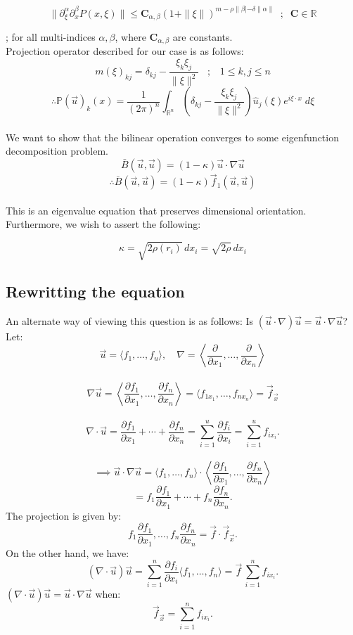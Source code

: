 \documentclass[12pt]{article}
\begin{document}
\[\|\partial_{\xi}^{\alpha} \partial_{x}^{\beta} P(x,\xi)\| \le \mathbf{C}_{\alpha,\beta} (1+\|\xi\|)^{m-\rho \|\beta| - \delta\|\alpha\|} \;\;;\;\; \mathbf{C}\in\mathbb{R}\] 

; for all multi-indices $\alpha, \beta$, where $\textbf{C}_{\alpha, \beta}$ are constants. \\ 

Projection operator described for our case is as follows: 
\[m(\xi)_{kj} = \delta_{kj} - \frac{\xi_{k}\xi_{j}}{\|\xi\|^{2}} \;\;\;;\;\;\; 1 \le k,j \le n\]
\[\therefore \mathbb{P}(\vec u)_{k}(x) = \frac{1}{(2\pi)^{n}} \int_{\mathbb{R}^{n}} \left(\delta_{kj} - \frac{\xi_{k}\xi_{j}}{\|\xi\|^{2}}\right) \hat u_{j} (\xi) e^{i\xi\cdot x} \;d\xi\] \\ 
We want to show that the bilinear operation converges to some eigenfunction decomposition problem. 
\[\bar B (\vec u, \vec u) = (1-\kappa) \vec u \cdot \nabla \vec u \]
\[\therefore \bar B (\vec u, \vec u) = (1-\kappa) \vec f_{1} (\vec u, \vec u)\] \\
This is an eigenvalue equation that preserves dimensional orientation. Furthermore, we wish to assert the following: 

\[\kappa = \sqrt{2\rho (r_{i})} \, dx_{i} = \sqrt{2\rho} \, dx_{i}\]

\subsection{Rewritting the equation}
An alternate way of viewing this question is as follows: Is $(\vec u \cdot \nabla) \vec u = \vec u \cdot \nabla \vec u$? \\

Let:
\[
\vec{u} = \langle f_1, \ldots, f_u \rangle, \quad \nabla = \left\langle \frac{\partial}{\partial x_1}, \ldots, \frac{\partial}{\partial x_n} \right\rangle
\] \\
\[
\nabla \vec{u} = \left\langle \frac{\partial f_1}{\partial x_1}, \ldots, \frac{\partial f_n}{\partial x_n} \right\rangle = \langle f_{1x_{1}}, \ldots, f_{nx_{n}} \rangle = \vec f_{\vec x}
\] \\ 
\[
\nabla \cdot \vec{u} = \frac{\partial f_1}{\partial x_1} + \cdots + \frac{\partial f_n}{\partial x_n} = \sum_{i=1}^u \frac{\partial f_i}{\partial x_i} = \sum_{i=1}^u f_{ix_{i}}.
\] \\ 
\[ \implies 
\vec{u} \cdot \nabla \vec{u} = \langle f_1, \ldots, f_n \rangle \cdot \left\langle \frac{\partial f_1}{\partial x_1}, \ldots, \frac{\partial f_n}{\partial x_n} \right\rangle
\]
\[
= f_1 \frac{\partial f_1}{\partial x_1} + \cdots + f_n \frac{\partial f_n}{\partial x_n}.
\]
The projection is given by:
\[
f_1 \frac{\partial f_1}{\partial x_1}, \ldots, f_n \frac{\partial f_n}{\partial x_n} = \vec f \cdot \vec f_{\vec x}.
\]
On the other hand, we have:
\[
(\nabla \cdot \vec{u}) \vec{u} = \sum_{i=1}^n \frac{\partial f_i}{\partial x_i} \langle f_1, \ldots, f_n \rangle = \vec f \,\sum_{i=1}^n f_{i x_i}.
\]
\((\nabla \cdot \vec{u}) \vec{u} = \vec{u} \cdot \nabla \vec{u}\) when:
\[
\vec f_{\vec x} = \sum_{i=1}^n f_{ix_i}.
\]
\end{document}
